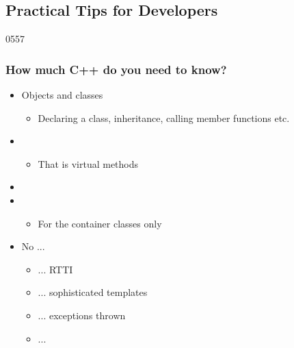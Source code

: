 %
%
%
%

\subsection{Practical Tips for Developers}

\begin{slide}{0557}
  \frametitle{How much C++ do you need to know?} \label{cpp_needed}
  \begin{itemize}
  \item Objects and classes
    \begin{itemize}
    \item Declaring a class, inheritance, calling member functions etc.
    \end{itemize}
  \item {}
    \begin{itemize}
    \item That is virtual methods
    \end{itemize}
  \item {}
  \item {}
    \begin{itemize}
    \item For the container classes only
    \end{itemize}
  \item No ...
    \begin{itemize}
    \item ... RTTI
    \item ... sophisticated templates
    \item ... exceptions thrown
    \item ...
    \end{itemize}

  \end{itemize}
\end{slide}

